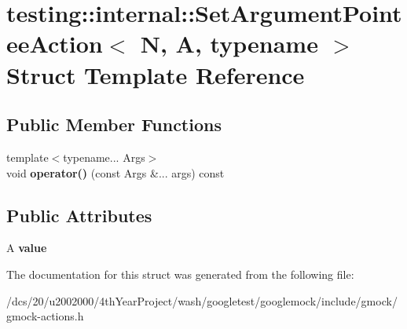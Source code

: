 \hypertarget{structtesting_1_1internal_1_1SetArgumentPointeeAction}{}\section{testing\+:\+:internal\+:\+:Set\+Argument\+Pointee\+Action$<$ N, A, typename $>$ Struct Template Reference}
\label{structtesting_1_1internal_1_1SetArgumentPointeeAction}
\subsection*{Public Member Functions}
\begin{DoxyCompactItemize}
\item 
\mbox{\label{structtesting_1_1internal_1_1SetArgumentPointeeAction_ae3810c11f1d85e57d1466c7d6b214495}} 
{\footnotesize template$<$typename... Args$>$ }\\void {\bfseries operator()} (const Args \&... args) const
\end{DoxyCompactItemize}
\subsection*{Public Attributes}
\begin{DoxyCompactItemize}
\item 
\mbox{\label{structtesting_1_1internal_1_1SetArgumentPointeeAction_ada437b06f7f7e1acd8b304a2b697f700}} 
A {\bfseries value}
\end{DoxyCompactItemize}


The documentation for this struct was generated from the following file\+:\begin{DoxyCompactItemize}
\item 
/dcs/20/u2002000/4th\+Year\+Project/wash/googletest/googlemock/include/gmock/gmock-\/actions.\+h\end{DoxyCompactItemize}
